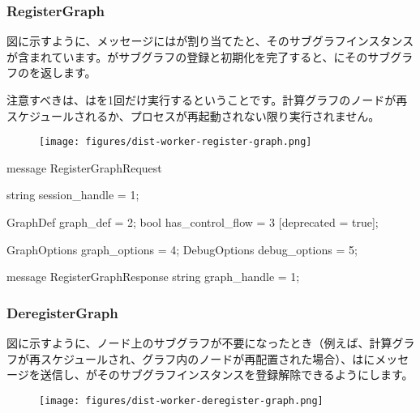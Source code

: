 \begin{content}
\subsubsection{RegisterGraph}

図に示すように、メッセージにはが割り当てたと、そのサブグラフインスタンスが含まれています。がサブグラフの登録と初期化を完了すると、にそのサブグラフのを返します。

注意すべきは、はを1回だけ実行するということです。計算グラフのノードが再スケジュールされるか、プロセスが再起動されない限り実行されません。

\begin{figure}[H]
\centering
\texttt{[image: figures/dist-worker-register-graph.png]}
\caption{}
 \label{fig:dist-worker-register-graph}
\end{figure}

\begin{leftbar}
\begin{c++}
message RegisterGraphRequest {
  string session_handle = 1;

  GraphDef graph_def = 2;
  bool has_control_flow = 3 [deprecated = true];

  GraphOptions graph_options = 4;
  DebugOptions debug_options = 5;
}

message RegisterGraphResponse {
  string graph_handle = 1;
}
\end{c++}
\end{leftbar}

\subsubsection{DeregisterGraph}

図に示すように、ノード上のサブグラフが不要になったとき（例えば、計算グラフが再スケジュールされ、グラフ内のノードが再配置された場合）、はにメッセージを送信し、がそのサブグラフインスタンスを登録解除できるようにします。

\begin{figure}[H]
\centering
\texttt{[image: figures/dist-worker-deregister-graph.png]}
\caption{}
 \label{fig:dist-worker-deregister-graph}
\end{figure}


\end{content}
